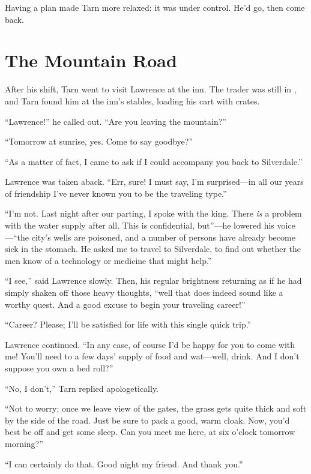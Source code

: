 Having a plan made Tarn more relaxed: it was under control.  He'd go, then come back.

\chapter{The Mountain Road}

After his shift, Tarn went to visit Lawrence at the inn.  The trader was still in \korbarthrond, and Tarn found him at the inn's stables, loading his cart with crates.

``Lawrence!'' he called out.  ``Are you leaving the mountain?''

``Tomorrow at sunrise, yes.  Come to say goodbye?''

``As a matter of fact, I came to ask if I could accompany you back to Silverdale.''

Lawrence was taken aback.  ``Err, sure!  I must say, I'm surprised---in all our years of friendship I've never known you to be the traveling type.''

``I'm not.  Last night after our parting, I spoke with the king.  There \emph{is} a problem with the water supply after all.  This is confidential, but''---he lowered his voice---``the city's wells are poisoned, and a number of persons have already become sick in the stomach.  He asked me to travel to Silverdale, to find out whether the men know of a technology or medicine that might help.''

``I see,'' said Lawrence slowly.  Then, his regular brightness returning as if he had simply shaken off those heavy thoughts, ``well that does indeed sound like a worthy quest.  And a good excuse to begin your traveling career!''

``Career?  Please; I'll be satisfied for life with this single quick trip.''

Lawrence continued.  ``In any case, of course I'd be happy for you to come with me!  You'll need to a few days' supply of food and wat---well, drink.  And I don't suppose you own a bed roll?''

``No, I don't,'' Tarn replied apologetically.

``Not to worry; once we leave view of the gates, the grass gets quite thick and soft by the side of the road.  Just be sure to pack a good, warm cloak.  Now, you'd best be off and get some sleep.  Can you meet me here, at six o'clock tomorrow morning?''

``I can certainly do that.  Good night my friend.  And thank you.''

